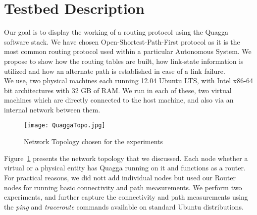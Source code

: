 \documentclass{article}
\begin{document}
\clearpage
\section{Testbed Description}
Our goal is to display the working of a routing protocol using the Quagga software stack.
We have chosen Open-Shortest-Path-First protocol as it is the most common routing protocol used
within a particular Autonomous System. We propose to show how the routing tables are built, 
how link-state information is utilized and how an alternate path is established in case of a link failure.\\
We use, two physical machines each running 12.04 Ubuntu LTS, with Intel x86-64 bit architectures with
32 GB of RAM. We run in each of these, two virtual machines which are directly connected to the host machine,
and also via an internal network between them.\\
\begin{figure}[ht!]
  \centering
  \texttt{[image: QuaggaTopo.jpg]}
  \caption{Network Topology chosen for the experiments}
  \label{fig:networktopo}
\end{figure}
Figure~\ref{fig:networktopo} presents the network topology that we discussed. Each node whether a virtual or a physical
entity has Quagga running on it and functions as a router. For practical reasons, we did nott add individual nodes
but used our Router nodes for running basic connectivity and path measurements. We perform two experiments, and
further capture the connectivity and path measurements using the \textit{ping} and \textit{traceroute} commands 
available on standard Ubuntu distributions.
\end{document}
